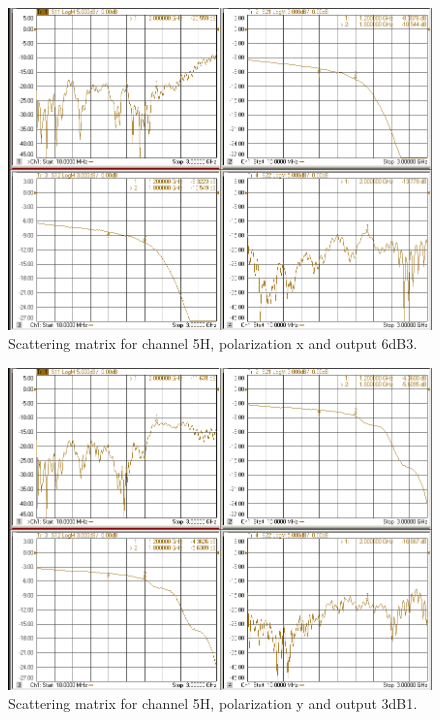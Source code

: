 \documentclass[12pt,a4paper,oneside]{article}
\begin{document}
\begin{figure}[H]
\centering
\includegraphics[width=0.9\linewidth]{VNA_results/5Hx_6dB3.png}
\caption{Scattering matrix for channel 5H, polarization x and output 6dB3.}
\label{fig:5Hx_6dB3}
\end{figure}


\begin{figure}[H]
\centering
\includegraphics[width=0.9\linewidth]{VNA_results/5Hy_3dB1.png}
\caption{Scattering matrix for channel 5H, polarization y and output 3dB1.}
\label{fig:5Hy_3dB1}
\end{figure}
\end{document}
